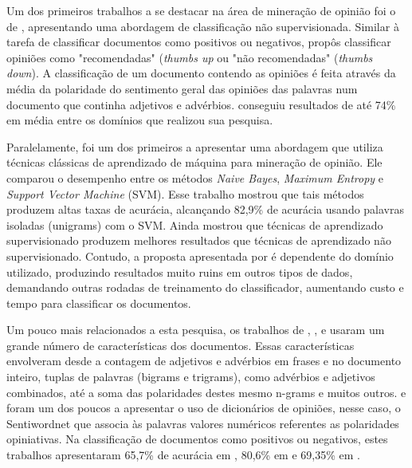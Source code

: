 \documentclass[template.tex]{subfiles}
\begin{document}
Um dos primeiros trabalhos a se destacar na área de mineração de opinião foi o de , apresentando uma abordagem de classificação não supervisionada. Similar à tarefa de classificar documentos como positivos ou negativos,  propôs classificar opiniões como "recomendadas" (\textit{thumbs up} ou "não recomendadas" (\textit{thumbs down}). A classificação de um documento contendo as opiniões é feita através da média da polaridade do sentimento geral das opiniões das palavras num documento que continha adjetivos e advérbios.  conseguiu resultados de até 74\% em média entre os domínios que realizou sua pesquisa.

Paralelamente,  foi um dos primeiros a apresentar uma abordagem que utiliza técnicas clássicas de aprendizado de máquina para mineração de opinião. Ele comparou o desempenho entre os métodos \textit{Naive Bayes}, \textit{Maximum Entropy} e \textit{Support Vector Machine} (SVM). Esse trabalho mostrou que tais métodos produzem altas taxas de acurácia, alcançando 82,9\% de acurácia usando palavras isoladas (unigrams) com o SVM. Ainda mostrou que técnicas de aprendizado supervisionado produzem melhores resultados que técnicas de aprendizado não supervisionado. Contudo, a proposta apresentada por  é dependente do domínio utilizado, produzindo resultados muito ruins em outros tipos de dados, demandando outras rodadas de treinamento do classificador, aumentando custo e tempo para classificar os documentos.

Um pouco mais relacionados a esta pesquisa, os trabalhos de , , e  usaram um grande número de características dos documentos. Essas características envolveram desde a contagem de adjetivos e advérbios em frases e no documento inteiro, tuplas de palavras (bigrams e trigrams), como advérbios e adjetivos combinados, até a soma das polaridades destes mesmo n-grams e muitos outros.  e  foram um dos poucos a apresentar o uso de dicionários de opiniões, nesse caso, o Sentiwordnet \cite{esuli2006sentiwordnet} que associa às palavras valores numéricos referentes as polaridades opiniativas. Na classificação de documentos como positivos ou negativos, estes trabalhos apresentaram 65,7\% de acurácia em , 80,6\% em  e 69,35\% em .
\end{document}
